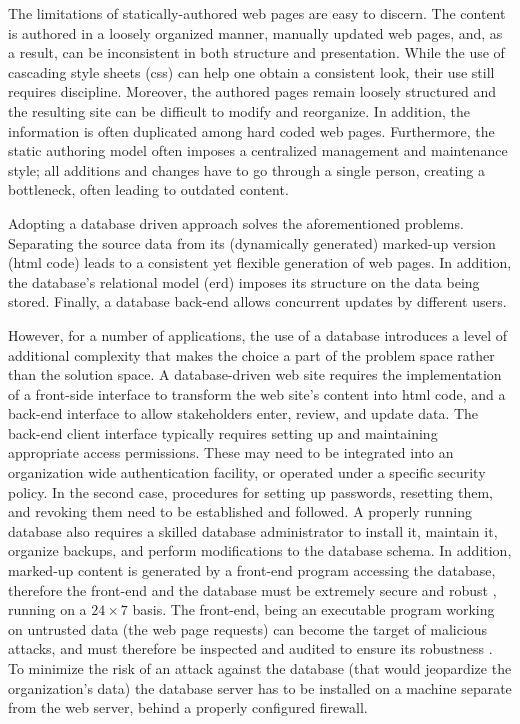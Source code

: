 \documentclass{elsart}
\begin{document}
The limitations of statically-authored web pages are easy to discern.
The content is authored in a loosely organized manner, manually updated web pages, and, as a result,
can be inconsistent in both structure and presentation.
While the use of cascading style sheets ({\sc css}) can help one obtain a
consistent look, their use still requires discipline.
Moreover, the authored pages remain loosely structured and the resulting
site can be difficult to modify and reorganize. In addition, the information is often duplicated
among hard coded web pages.
Furthermore, the static authoring model often imposes a centralized
management and maintenance style;
all additions and changes have to go through a single person,
creating a bottleneck, often leading to outdated content.

Adopting a database driven approach solves
the aforementioned problems.
Separating the source data from its (dynamically generated)
marked-up version ({\sc html} code) leads to a consistent
yet flexible generation of web pages.
In addition, the database's relational model ({\sc erd}) imposes
its structure on the data being stored.
Finally, a database back-end allows concurrent updates by
different users.

However, for a number of applications, the use of a database
introduces a level of additional complexity that
makes the choice a part of
the problem space rather than the solution space.
A database-driven web site requires the implementation of a
front-side interface to transform the web site's content into
{\sc html} code, and a back-end interface to allow stakeholders
enter, review, and update data.
The back-end client interface typically requires setting up
and maintaining appropriate access permissions.
These may need to be integrated into an organization wide authentication 
facility, or operated under a specific security policy.
In the second case, procedures for setting up passwords,
resetting them, and revoking them need to be established and followed.
A properly running database also requires a skilled database
administrator to install it, maintain it, organize backups,
and perform modifications to the database schema.
In addition, marked-up content is generated by a front-end
program accessing the database, therefore the front-end and the database
must be extremely secure and robust \cite{VG01}, running on a $24 \times 7$ basis.
The front-end, being an executable program working on
untrusted data (the web page requests) can become the target of
malicious attacks,
and must therefore be inspected and audited to ensure its robustness \cite{YHDM04}.
To minimize the risk of an attack against the database
(that would jeopardize the organization's data)
the database server has to be installed on a machine separate
from the web server, behind a properly configured firewall.
\end{document}
